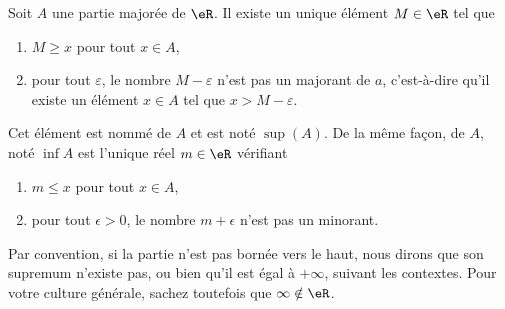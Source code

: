 \begin{propositionDef}		\label{DefSupeA}
	Soit \( A\) une partie majorée de \( \eR\). Il existe un unique élément \( M\in \eR\) tel que
	\begin{enumerate}
		\item
		      \( M\geq x\) pour tout \( x\in A\),
		\item
		      pour tout \( \varepsilon\), le nombre \( M-\varepsilon\) n'est pas un majorant de \( a\), c'est-à-dire qu'il existe un élément \( x\in A\) tel que \( x>M-\varepsilon\).
	\end{enumerate}

    Cet élément est nommé  de \( A\) et est noté \( \sup(A)\). De la même façon,  de \( A\), noté \( \inf A\) est l'unique réel \( m\in\eR\) vérifiant
    \begin{enumerate}
        \item
            \( m\leq x\) pour tout \( x\in A\),
        \item
            pour tout \( \epsilon>0\), le nombre \( m+\epsilon\) n'est pas un minorant.
    \end{enumerate}
\end{propositionDef}

Par convention, si la partie n'est pas bornée vers le haut, nous dirons que son supremum n'existe pas, ou bien qu'il est égal à \( +\infty\), suivant les contextes. Pour votre culture générale, sachez toutefois que \( \infty\notin\eR\).


